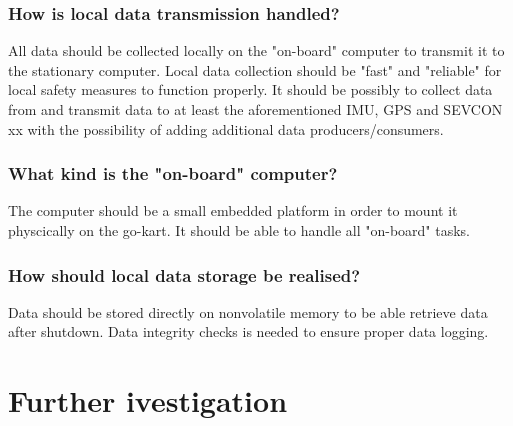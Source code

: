 \subsubsection*{How is local data transmission handled?}
All data should be collected locally on the "on-board" computer to transmit it to the stationary computer.
Local data collection should be "fast" and "reliable" for local safety measures to function properly.
It should be possibly to collect data from and transmit data to at least the 
aforementioned IMU, GPS and SEVCON xx with the possibility of adding additional 
data producers/consumers.

\subsubsection*{What kind is the "on-board" computer?}
The computer should be a small embedded platform in order to mount it physcically on the go-kart.
It should be able to handle all "on-board" tasks.

\subsubsection*{How should local data storage be realised?}
Data should be stored directly on nonvolatile memory to be able retrieve data after shutdown.
Data integrity checks is needed to ensure proper data logging.


\section{Further ivestigation}




